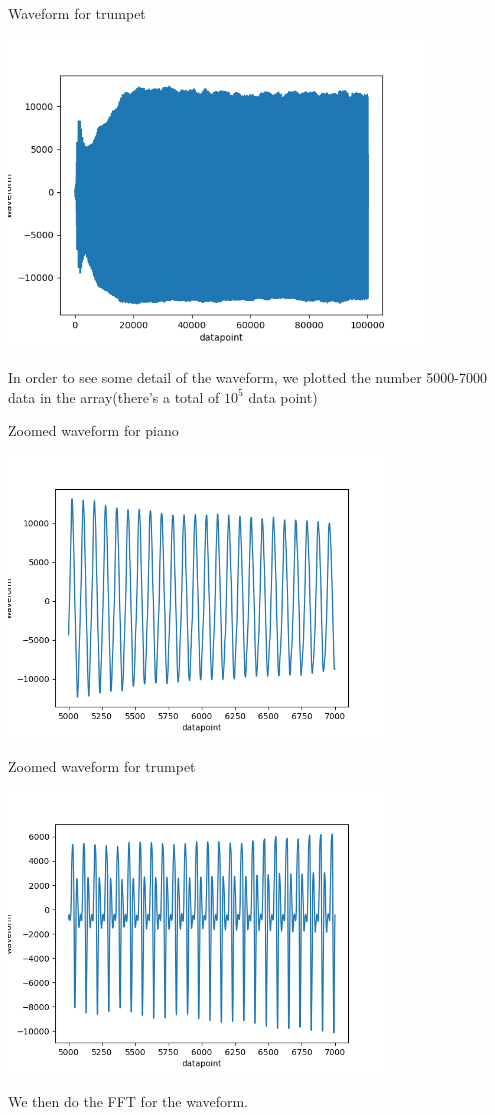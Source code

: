 \documentclass[letterpaper,12pt]{article}
\begin{document}
\begin{table}[!h]
    \centering
    \caption{Waveform for trumpet}
    \includegraphics[width=11cm]{8-2-2.png}
\end{table}%

\newpage
In order to see some detail of the waveform, we plotted the number 5000-7000 data in the array(there's a total of $10^5$ data point)

\begin{table}[!h]
    \centering
    \caption{Zoomed waveform for piano}
    \includegraphics[width=10cm]{8-2-3.png}
\end{table}%

\begin{table}[!h]
    \centering
    \caption{Zoomed waveform for trumpet}
    \includegraphics[width=10cm]{8-2-4.png}
\end{table}%
\newpage
We then do the FFT for the waveform.
\end{document}
